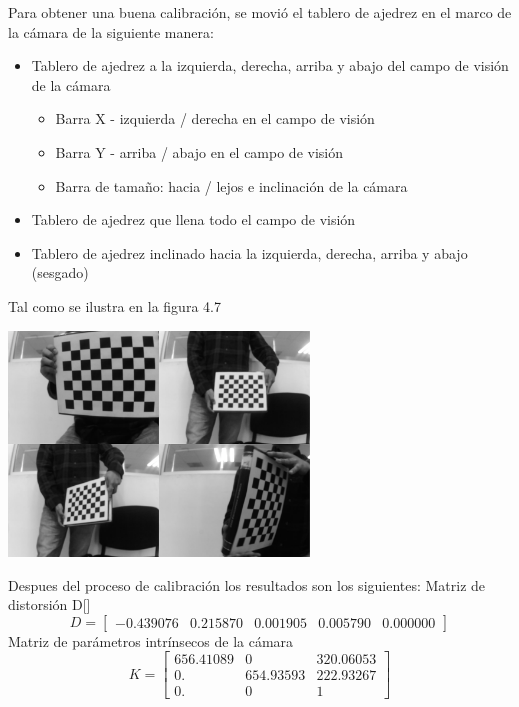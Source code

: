 Para obtener una buena calibración, se movió el tablero de ajedrez en el marco de la cámara de
la siguiente manera:
\begin{itemize}
	\item Tablero de ajedrez a la izquierda, derecha, arriba y abajo del campo de visión de la cámara
	      \begin{itemize}
		      \item Barra X - izquierda / derecha en el campo de visión
		      \item Barra Y - arriba / abajo en el campo de visión
		      \item Barra de tamaño: hacia / lejos e inclinación de la cámara
	      \end{itemize}
	\item Tablero de ajedrez que llena todo el campo de visión
	\item Tablero de ajedrez inclinado hacia la izquierda, derecha, arriba y abajo (sesgado)
\end{itemize}
Tal como se ilustra en la figura 4.7
\begin{center}
	\includegraphics[width=0.6\textwidth]{Contenido/Cuerpo/Capitulo4/Fig12.eps}
	\label{Fig1}
\end{center}
Despues del proceso de calibración los resultados son los siguientes:
Matriz de distorsión D[]
\begin{equation}
	D=
	\begin{bmatrix}
		-0.439076 & 0.215870 & 0.001905 & 0.005790 & 0.000000
	\end{bmatrix}
\end{equation}
Matriz de parámetros intrínsecos de la cámara
\begin{equation}
	K=
	\begin{bmatrix}
		656.41089 & 0         & 320.06053 \\
		0.        & 654.93593 & 222.93267 \\
		0.        & 0         & 1
	\end{bmatrix}
\end{equation}

